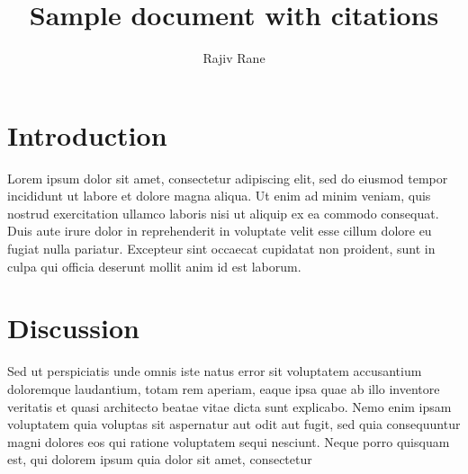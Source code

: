 \documentclass{article}
\begin{document}
\title{Sample document with citations}
\author{Rajiv Rane}
\date{}
\maketitle
\section*{Introduction}
Lorem ipsum dolor sit amet,
consectetur adipiscing elit, sed do eiusmod
tempor incididunt ut labore et dolore magna
aliqua. Ut enim ad\cite{ipcc2018} minim veniam, quis nostrud
exercitation ullamco laboris nisi ut aliquip ex ea
commodo consequat. Duis aute irure dolor in reprehenderit
in voluptate velit esse cillum dolore eu fugiat nulla pariatur.
Excepteur sint occaecat cupidatat non proident, sunt in culpa qui
officia deserunt mollit anim id est laborum.
\cite{noaa2020,parmesan2006}
\section*{Discussion}
Sed ut perspiciatis unde omnis \cite{adger2005}iste natus error
 sit voluptatem accusantium doloremque laudantium, 
 totam rem aperiam, eaque ipsa quae ab illo inventore 
 veritatis et quasi\cite{islam2017} architecto beatae vitae dicta sunt 
 explicabo. Nemo enim ipsam voluptatem quia voluptas sit 
 aspernatur aut odit aut fugit, sed quia consequuntur magni 
 dolores eos qui ratione voluptatem sequi nesciunt. Neque porro 
 quisquam est, qui dolorem ipsum quia dolor sit amet, consectetur
 \cite{moser2007}


\end{document}
